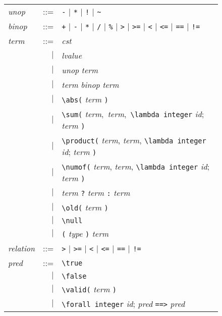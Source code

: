 \begin{figure}[tb]
  \begin{tabular}{lrl}
    \textit{unop} & ::= & \lstinline'-' $\mid$ \lstinline'*' $\mid$
    \lstinline'!' $\mid$ \lstinline'~' \\
    \textit{binop} & ::= & \lstinline'+' $\mid$ \lstinline'-' $\mid$
    \lstinline'*' $\mid$ \lstinline'/' $\mid$ \lstinline'%' $\mid$
    \lstinline'>' $\mid$ \lstinline'>=' $\mid$ \lstinline'<' $\mid$
    \lstinline'<=' $\mid$ \lstinline'==' $\mid$ \lstinline'!=' \\
    \textit{term} & ::= & \textit{cst} \\
    & $\mid$ & \textit{lvalue} \\
    & $\mid$ & \textit{unop} \textit{term} \\
    & $\mid$ & \textit{term} \textit{binop} \textit{term} \\
    & $\mid$ & \lstinline'\abs(' \textit{term} \lstinline')' \\
    & $\mid$ & \lstinline'\sum(' \textit{term}$,$ \textit{term}$,$
    \lstinline'\lambda integer' \textit{id}$;$ \textit{term} \lstinline')' \\
    & $\mid$ & \lstinline'\product(' \textit{term}, \textit{term},
    \lstinline'\lambda integer' \textit{id}; \textit{term} \lstinline')' \\
    & $\mid$ & \lstinline'\numof(' \textit{term}, \textit{term},
    \lstinline'\lambda integer' \textit{id}; \textit{term} \lstinline')' \\
    & $\mid$ & \textit{term} \texttt{?} \textit{term} \texttt{:} \textit{term}\\
    & $\mid$ & \lstinline'\old(' \textit{term} \lstinline')' \\
    & $\mid$ & \lstinline'\null' \\
    & $\mid$ & \lstinline'(' \textit{type} \lstinline')' \textit{term} \\
    \textit{relation} & ::= & \lstinline'>' $\mid$ \lstinline'>=' $\mid$
    \lstinline'<' $\mid$ \lstinline'<=' $\mid$ \lstinline'==' $\mid$
    \lstinline'!=' \\
    \textit{pred} & ::= & \lstinline'\true' \\
    & $\mid$ & \lstinline'\false' \\
    & $\mid$ & \lstinline'\valid(' \textit{term} \lstinline')' \\
    & $\mid$ & \lstinline'\forall integer' \textit{id};
    \textit{pred} \lstinline'==>' \textit{pred} \\

\end{tabular}
\end{figure}

